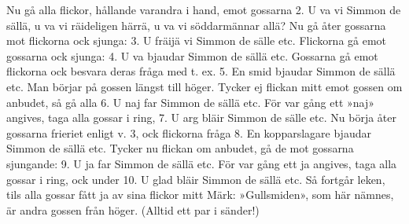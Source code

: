 Nu gå alla flickor, hållande varandra i hand, emot gossarna
2.  U va vi Simmon de sällä,
    u va vi räideligen härrä,
    u va vi söddarmännar allä?
    Nu gå åter gossarna mot flickorna ock sjunga:
3.  U fräijä vi Simmon de sälle etc.
    Flickorna gå emot gossarna ock sjunga:
4.  U va bjaudar Simmon de sällä etc.
    Gossarna gå emot flickorna ock besvara deras fråga med t. ex.
5.  En smid bjaudar Simmon de sällä etc.
    Man börjar på gossen längst till höger.
    Tycker ej flickan mitt emot gossen om anbudet, så gå alla
6.  U naj far Simmon de sällä etc.
    För var gång ett »naj» angives, taga alla gossar i ring,
7.  U arg bläir Simmon de sälle etc.
    Nu börja åter gossarna frieriet enligt v. 3, ock flickorna fråga
8.  En kopparslagare bjaudar Simmon de sällä etc.
    Tycker nu flickan om anbudet, gå de mot gossarna sjungande:
9.  U ja far Simmon de sällä etc.
    För var gång ett ja angives, taga alla gossar i ring, ock under
10. U glad bläir Simmon de sällä etc.
    Så fortgår leken, tils alla gossar fått ja av sina flickor mitt
Märk: »Gullsmiden», som här nämnes, är andra gossen från höger.
(Alltid ett par i sänder!)
